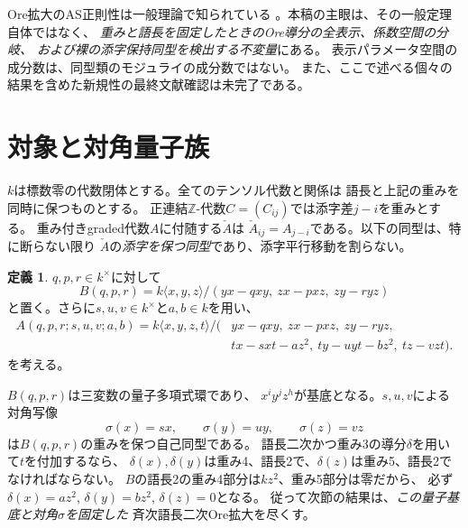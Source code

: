 \documentclass[11pt,a4paper]{ltjsarticle}
\theoremstyle{definition}
\newtheorem{definition}[theorem]{定義}
\begin{document}
Ore拡大のAS正則性は一般理論で知られている
\cite[Theorem~3.3]{LWW}。本稿の主眼は、その一般定理自体ではなく、
\emph{重みと語長を固定したときのOre導分の全表示、係数空間の分岐、
および裸の添字保持同型を検出する不変量}にある。
表示パラメータ空間の成分数は、同型類のモジュライの成分数ではない。
また、ここで述べる個々の結果を含めた新規性の最終文献確認は未完了である。

\section{対象と対角量子族}
$k$は標数零の代数閉体とする。全てのテンソル代数と関係は
語長と上記の重みを同時に保つものとする。
正連結$\mathbb Z$-代数$C=(C_{ij})$では添字差$j-i$を重みとする。
重み付きgraded代数$A$に付随する$\check A$は
$\check A_{ij}=A_{j-i}$である。以下の同型は、特に断らない限り
$\check A$の\emph{添字を保つ同型}であり、添字平行移動を割らない。

\begin{definition}\label{diag:def:quantum}
$q,p,r\in k^\times$に対して
\[
B(q,p,r)=k\langle x,y,z\rangle/
(yx-qxy,\ zx-pxz,\ zy-ryz)
\]
と置く。さらに$s,u,v\in k^\times$と$a,b\in k$を用い、
\begin{equation}\label{diag:eq:family}
\begin{split}
A(q,p,r;s,u,v;a,b)=k\langle x,y,z,t\rangle/(&yx-qxy,\ zx-pxz,\ zy-ryz,\\
&tx-sxt-az^2,\ ty-uyt-bz^2,\ tz-vzt).
\end{split}
\end{equation}
を考える。
\end{definition}

$B(q,p,r)$は三変数の量子多項式環であり、
$x^iy^jz^h$が基底となる。$s,u,v$による対角写像
\[\sigma(x)=sx,\qquad \sigma(y)=uy,\qquad \sigma(z)=vz\]
は$B(q,p,r)$の重みを保つ自己同型である。
語長二次かつ重み3の導分$\delta$を用いて$t$を付加するなら、
$\delta(x),\delta(y)$は重み4、語長2で、$\delta(z)$は重み5、語長2でなければならない。
$B$の語長2の重み4部分は$kz^2$、重み5部分は零だから、
必ず$\delta(x)=az^2$, $\delta(y)=bz^2$, $\delta(z)=0$となる。
従って次節の結果は、\emph{この量子基底と対角$\sigma$を固定した}
斉次語長二次Ore拡大を尽くす。
\end{document}
